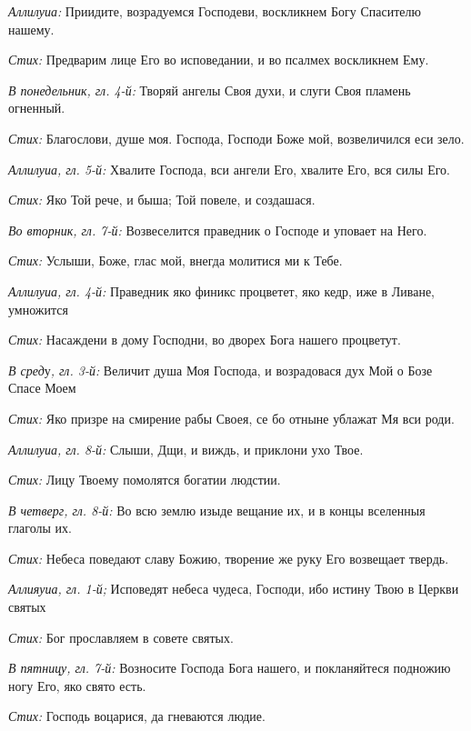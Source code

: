  {\itshape Аллилуиа:} Приидите, возрадуемся Господеви, воскликнем Богу Спасителю нашему.

 {\itshape Стих:} Предварим лице Его во исповедании, и во псалмех воскликнем Ему.

 


 {\itshape В понедельник, гл. 4-й:} Творяй ангелы Своя духи, и слуги Своя пламень огненный.

 {\itshape Стих:} Благослови, душе моя. Господа, Господи Боже мой, возвеличился еси зело.

 {\itshape Аллилуиа, гл. 5-й:} Хвалите Господа, вси ангели Его, хвалите Его, вся силы Его.

 {\itshape Стих:} Яко Той рече, и быша; Той повеле, и создашася.

 {\itshape Во вторник, гл. 7-й:} Возвеселится праведник о Господе и уповает на Него.

 {\itshape Стих:} Услыши, Боже, глас мой, внегда молитися ми к Тебе.

 {\itshape Аллилуиа, гл. 4-й:} Праведник яко финикс процветет, яко кедр, иже в Ливане, умножится

 {\itshape Стих:} Насаждени в дому Господни, во дворех Бога нашего процветут.

 {\itshape В сред}у{\itshape , гл. 3-й:} Величит душа Моя Господа, и возрадовася дух Мой о Бозе Спасе Моем

 {\itshape Стих:} Яко призре на смирение рабы Своея, се бо отныне ублажат Мя вси роди.

 {\itshape Аллилуиа, гл. 8-й:} Слыши, Дщи, и виждь, и приклони ухо Твое.

 {\itshape Стих:} Лицу Твоему помолятся богатии людстии.

 {\itshape В четверг, гл. 8-й:} Во всю землю изыде вещание их, и в концы вселенныя глаголы их.

 {\itshape Стих:} Небеса поведают славу Божию, творение же руку Его возвещает твердь.

 {\itshape Аллияуиа, гл. 1-й;} Исповедят небеса чудеса, Господи, ибо истину Твою в Церкви святых

 {\itshape Стих:} Бог прославляем в совете святых.

 {\itshape В пятницу, гл. 7-й:} Возносите Господа Бога нашего, и покланяйтеся подножию ногу Его, яко свято есть.

 {\itshape Стих:} Господь воцарися, да гневаются людие.

